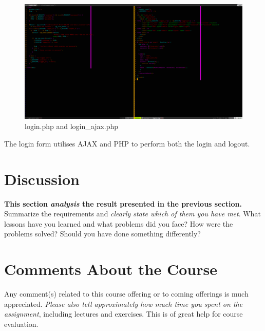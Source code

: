 \documentclass[a4paper]{scrartcl}
\begin{document}
\begin{figure}[H]
  \begin{center}
    \includegraphics[scale=0.32]{images/login_code.png}
    \caption{login.php and login\_ajax.php}
    \label{fig:login_code}
  \end{center}
\end{figure}
The login form utilises AJAX and PHP to perform both the login and logout.

\section{Discussion}

\textbf{This section \textit{analysis} the result presented in the previous section.} \\

\noindent Summarize the requirements and \textit{clearly state which of them you have met}. What lessons have you learned and what problems did you face? How were the problems solved? Should you have done something differently?

\section{Comments About the Course}

Any comment(s) related to this course offering or to coming offerings is much appreciated. \textit{Please also tell approximately how much time you spent on the assignment}, including lectures and exercises. This is of great help for course evaluation.
\end{document}
